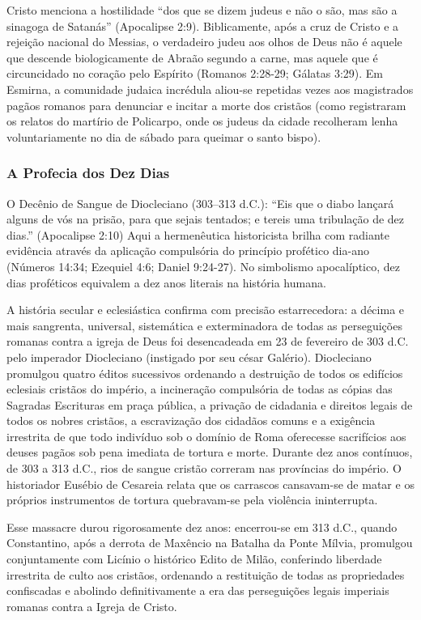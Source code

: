 Cristo menciona a hostilidade ``dos que se dizem judeus e não o são, mas são a sinagoga de Satanás'' (Apocalipse 2:9). Biblicamente, após a cruz de Cristo e a rejeição nacional do Messias, o verdadeiro judeu aos olhos de Deus não é aquele que descende biologicamente de Abraão segundo a carne, mas aquele que é circuncidado no coração pelo Espírito (Romanos 2:28-29; Gálatas 3:29). Em Esmirna, a comunidade judaica incrédula aliou-se repetidas vezes aos magistrados pagãos romanos para denunciar e incitar a morte dos cristãos (como registraram os relatos do martírio de Policarpo, onde os judeus da cidade recolheram lenha voluntariamente no dia de sábado para queimar o santo bispo).


\subsubsection*{A Profecia dos Dez Dias}
O Decênio de Sangue de Diocleciano (303–313 d.C.):
``Eis que o diabo lançará alguns de vós na prisão, para que sejais tentados; e tereis uma tribulação de dez dias.'' (Apocalipse 2:10)
Aqui a hermenêutica historicista brilha com radiante evidência através da aplicação compulsória do princípio profético dia-ano (Números 14:34; Ezequiel 4:6; Daniel 9:24-27). No simbolismo apocalíptico, dez dias proféticos equivalem a dez anos literais na história humana.

A história secular e eclesiástica confirma com precisão estarrecedora: a décima e mais sangrenta, universal, sistemática e exterminadora de todas as perseguições romanas contra a igreja de Deus foi desencadeada em 23 de fevereiro de 303 d.C. pelo imperador Diocleciano (instigado por seu césar Galério). Diocleciano promulgou quatro éditos sucessivos ordenando a destruição de todos os edifícios eclesiais cristãos do império, a incineração compulsória de todas as cópias das Sagradas Escrituras em praça pública, a privação de cidadania e direitos legais de todos os nobres cristãos, a escravização dos cidadãos comuns e a exigência irrestrita de que todo indivíduo sob o domínio de Roma oferecesse sacrifícios aos deuses pagãos sob pena imediata de tortura e morte. Durante dez anos contínuos, de 303 a 313 d.C., rios de sangue cristão correram nas províncias do império. O historiador Eusébio de Cesareia relata que os carrascos cansavam-se de matar e os próprios instrumentos de tortura quebravam-se pela violência ininterrupta.

Esse massacre durou rigorosamente dez anos: encerrou-se em 313 d.C., quando Constantino, após a derrota de Maxêncio na Batalha da Ponte Mílvia, promulgou conjuntamente com Licínio o histórico Edito de Milão, conferindo liberdade irrestrita de culto aos cristãos, ordenando a restituição de todas as propriedades confiscadas e abolindo definitivamente a era das perseguições legais imperiais romanas contra a Igreja de Cristo.


